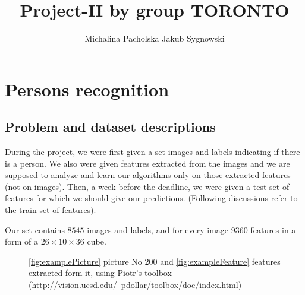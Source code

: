 \documentclass[]{article}
\title{Project-II by group TORONTO}
\author{Michalina Pacholska \And Jakub Sygnowski}
\begin{document}
\section{Persons recognition}
\subsection{Problem and dataset descriptions}
  During the project, we were first given a set images and labels indicating if there is a person. We also were given features extracted from the images and we are supposed to analyze and learn our algorithms only on those extracted features (not on images). Then, a week before the deadline, we were given a test set of features for which we should give our predictions. (Following discussions refer to the train set of features). 

  Our set contains $8545$ images and labels, and for every image $9360$ features in a form of a $26\times10\times36$ cube.

\begin{figure}[!h]
  \center
  \;
  \caption{ \ref{fig:examplePicture} picture No 200 and \ref{fig:exampleFeature} features extracted form it, using Piotr's toolbox (http://vision.ucsd.edu/~pdollar/toolbox/doc/index.html) %
  }
\end{figure}
\end{document}
